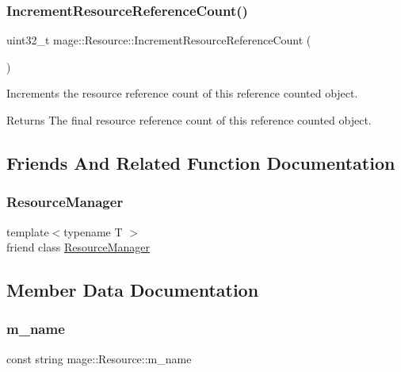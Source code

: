 \subsubsection{\texorpdfstring{Increment\+Resource\+Reference\+Count()}{IncrementResourceReferenceCount()}}
{\footnotesize\ttfamily uint32\+\_\+t mage\+::\+Resource\+::\+Increment\+Resource\+Reference\+Count (\begin{DoxyParamCaption}{ }\end{DoxyParamCaption})\hspace{0.3cm}{\ttfamily [private]}}

Increments the resource reference count of this reference counted object.

\begin{DoxyReturn}{Returns}
The final resource reference count of this reference counted object. 
\end{DoxyReturn}


\subsection{Friends And Related Function Documentation}
\hypertarget{classmage_1_1_resource_a51a7bf7c13d389aeee09c16059ca41c9}{}\label{classmage_1_1_resource_a51a7bf7c13d389aeee09c16059ca41c9} 
\subsubsection{\texorpdfstring{Resource\+Manager}{ResourceManager}}
{\footnotesize\ttfamily template$<$typename T $>$ \\
friend class \hyperlink{classmage_1_1_resource_manager}{Resource\+Manager}\hspace{0.3cm}{\ttfamily [friend]}}



\subsection{Member Data Documentation}
\hypertarget{classmage_1_1_resource_a93019b74e9665195f1af17c60b6d171a}{}\label{classmage_1_1_resource_a93019b74e9665195f1af17c60b6d171a} 
\subsubsection{\texorpdfstring{m\+\_\+name}{m\_name}}
{\footnotesize\ttfamily const string mage\+::\+Resource\+::m\+\_\+name\hspace{0.3cm}{\ttfamily [private]}}

